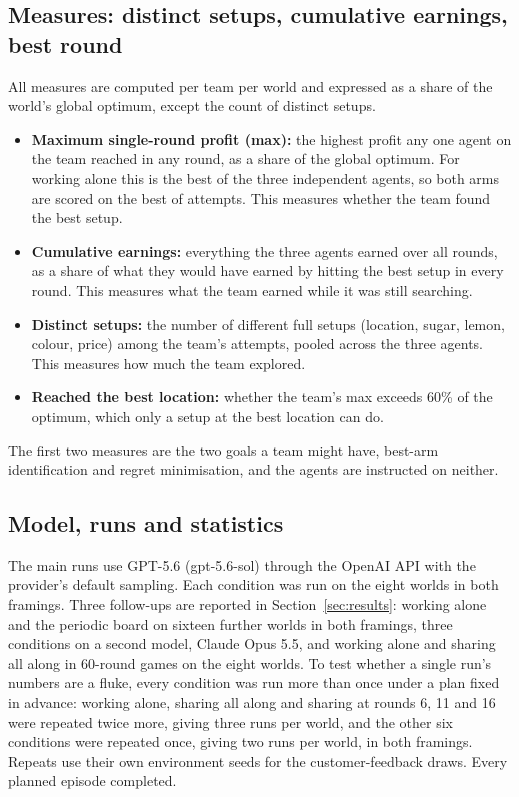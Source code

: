\subsection{Measures: distinct setups, cumulative earnings, best round}\label{sec:measures}

All measures are computed per team per world and expressed as a share of the world's global optimum, except
the count of distinct setups.

\begin{itemize}[leftmargin=*, itemsep=2pt]
  \item \textbf{Maximum single-round profit (max):} the highest profit any one agent on the team reached in
    any round, as a share of the global optimum. For working alone this is the best of the three independent
    agents, so both arms are scored on the best of \NAttempts{} attempts. This measures whether the team
    found the best setup.
  \item \textbf{Cumulative earnings:} everything the three agents earned over all \NRounds{} rounds, as a
    share of what they would have earned by hitting the best setup in every round. This measures what the
    team earned while it was still searching.
  \item \textbf{Distinct setups:} the number of different full setups (location, sugar, lemon, colour, price)
    among the team's \NAttempts{} attempts, pooled across the three agents. This measures how much the team
    explored.
  \item \textbf{Reached the best location:} whether the team's max exceeds 60\% of the optimum, which only
    a setup at the best location can do.
\end{itemize}

The first two measures are the two goals a team might have, best-arm identification and regret minimisation,
and the agents are instructed on neither.

\subsection{Model, runs and statistics}\label{sec:stats}

The main runs use GPT-5.6 (gpt-5.6-sol) through the OpenAI API with the provider's default sampling. Each
condition was run on the eight worlds in both framings. Three follow-ups are reported in Section~\ref{sec:results}: working alone and the periodic board on sixteen further worlds in both
framings, three conditions on a second model, Claude Opus 5.5, and working alone and sharing all along in
60-round games on the eight worlds. To test whether a single run's numbers are a fluke, every condition was
run more than once under a plan fixed in advance: working alone, sharing all along and sharing at rounds 6, 11 and 16 were repeated
twice more, giving three runs per world, and the other six conditions were repeated once, giving two runs per
world, in both framings. Repeats use their own environment seeds for the customer-feedback draws. Every planned
episode completed.

